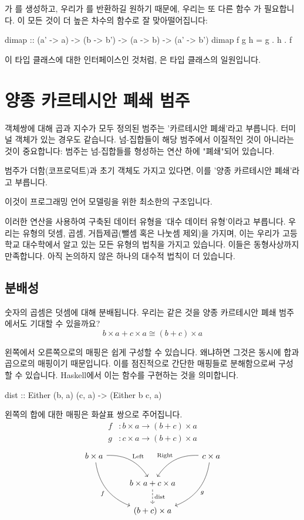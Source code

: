\documentclass[DaoFP]{subfiles}
\begin{document}
가 를 생성하고, 우리가 를 반환하길 원하기 때문에, 우리는 또 다른 함수 가 필요합니다. 이 모든 것이 더 높은 차수의 함수로 잘 맞아떨어집니다:
\begin{haskell}
dimap :: (a' -> a) -> (b -> b') -> (a -> b) -> (a' -> b')
dimap f g h = g . h . f
\end{haskell}
이  타입 클래스에 대한 인터페이스인 것처럼, 은  타입 클래스의 일원입니다.

\section{양종 카르테시안 폐쇄 범주}

객체쌍에 대해 곱과 지수가 모두 정의된 범주는 '카르테시안 폐쇄'라고 부릅니다. 터미널 객체가 있는 경우도 같습니다. 넘-집합들이 해당 범주에서 이질적인 것이 아니라는 것이 중요합니다: 범주는 넘-집합들를 형성하는 연산 하에 "폐쇄"되어 있습니다.

범주가 더함(코프로덕트)과 초기 객체도 가지고 있다면, 이를 '양종 카르테시안 폐쇄'라고 부릅니다.

이것이 프로그래밍 언어 모델링을 위한 최소한의 구조입니다.

이러한 연산을 사용하여 구축된 데이터 유형을 '대수 데이터 유형'이라고 부릅니다. 우리는 유형의 덧셈, 곱셈, 거듭제곱(뺄셈 혹은 나눗셈 제외)을 가지며, 이는 우리가 고등학교 대수학에서 알고 있는 모든 유형의 법칙을 가지고 있습니다. 이들은 동형사상까지 만족합니다. 아직 논의하지 않은 하나의 대수적 법칙이 더 있습니다.

\subsection{분배성}

숫자의 곱셈은 덧셈에 대해 분배됩니다. 우리는 같은 것을 양종 카르테시안 폐쇄 범주에서도 기대할 수 있을까요?
\[b \times a + c \times a \cong (b + c) \times a\]

왼쪽에서 오른쪽으로의 매핑은 쉽게 구성할 수 있습니다. 왜냐하면 그것은 동시에 합과 곱으로의 매핑이기 때문입니다. 이를 점진적으로 간단한 매핑들로 분해함으로써 구성할 수 있습니다. Haskell에서 이는 함수를 구현하는 것을 의미합니다.
\begin{haskell}
dist :: Either (b, a) (c, a) -> (Either b c, a)
\end{haskell}
왼쪽의 합에 대한 매핑은 화살표 쌍으로 주어집니다.
\begin{align*}
f &\colon b\times a \to (b + c) \times a \\
g &\colon c\times a \to (b + c) \times a 
\end{align*}
\[
 \begin{tikzcd}
 b \times a
 \arrow[dr,  bend left, "\text{Left}"]
 \arrow[ddr, bend right, "f"']
 && c \times a
 \arrow[dl, bend right, "\text{Right}"']
 \arrow[ddl, bend left, "g"]
 \\
& b \times a + c \times a
\arrow[d, dashed, "\text{dist}"]
\\
& (b + c) \times a
 \end{tikzcd}
\]
\end{document}
